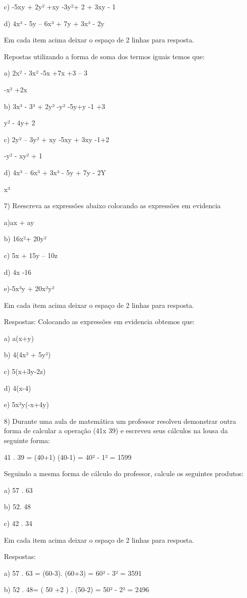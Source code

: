 c) -5xy + 2y² +xy -3y²+ 2 + 3xy - 1

d) 4x³ - 5y -- 6x³ + 7y + 3x³ - 2y

Em cada item acima deixar o espaço de 2 linhas para resposta.

Repostas utilizando a forma de soma dos termos iguais temos que:

a) 2x² - 3x² -5x +7x +3 -- 3

-x² +2x

b) 3x³ - 3³ + 2y² -y² -5y+y -1 +3

y² - 4y+ 2

c) 2y² -- 3y² + xy -5xy + 3xy -1+2

-y² - xy² + 1

d) 4x³ -- 6x³ + 3x³ - 5y + 7y - 2Y

x³

7) Reescreva as expressões abaixo colocando as expressões em evidencia

a)ax + ay

b) 16x²+ 20y²

c) 5x + 15y -- 10z

d) 4x -16

e)-5x³y + 20x²y²

Em cada item acima deixar o espaço de 2 linhas para resposta.

Respostas: Colocando as expressões em evidencia obtemos que:

a) a(x+y)

b) 4(4x² + 5y²)

c) 5(x+3y-2z)

d) 4(x-4)

e) 5x²y(-x+4y)

8) Durante uma aula de matemática um professor resolveu demonstrar outra
forma de calcular a operação (41x 39) e escreveu seus cálculos na lousa
da seguinte forma:

41 . 39 = (40+1) (40-1) = 40² - 1² = 1599

Seguindo a mesma forma de cálculo do professor, calcule os seguintes
produtos:

a) 57 . 63

b) 52. 48

c) 42 . 34

Em cada item acima deixar o espaço de 2 linhas para resposta.

Respostas:

a) 57 . 63 = (60-3). (60+3) = 60² - 3² = 3591

b) 52 . 48= ( 50 +2 ) . (50-2) = 50² - 2² = 2496

